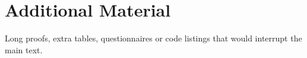 \chapter{Additional Material}
Long proofs, extra tables, questionnaires or code listings that would interrupt the main text.
